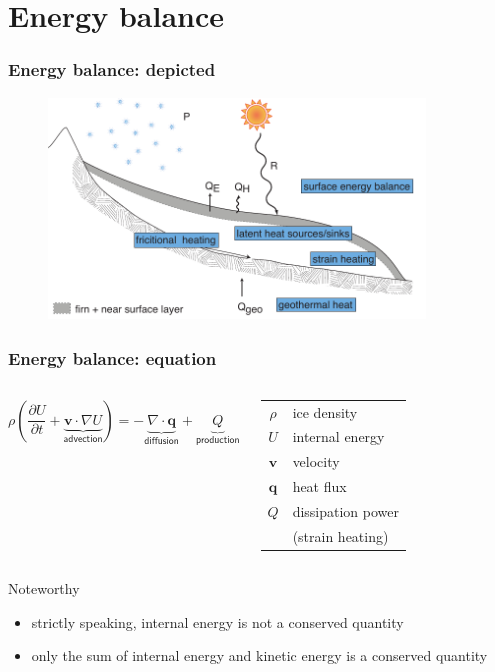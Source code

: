 \documentclass[hide notes,intlimits,unknownkeysallowed]{beamer}
\newcommand{\bq}{\mathbf{q}}
\newcommand{\bv}{\mathbf{v}}
\newcommand{\ddt}[1]{\ensuremath{\frac{\partial #1}{\partial t}}}
\newcommand{\Div}{\nabla\cdot}
\newcommand{\grad}{\nabla}
\begin{document}
\section{Energy balance}
\label{sec:energy-balance}

\begin{frame}
  \frametitle{Energy balance: depicted}
  \begin{figure}
    \includegraphics[width=10cm]{glacier_thermodynamics}
  \end{figure}
\end{frame}


\begin{frame}
  \frametitle{Energy balance: equation}
  \begin{columns}
    \column[c]{7cm}
    \begin{equation*}
      \rho \left(\ddt{U} + \underbrace{\bv \cdot \grad U}_{\textsf{advection}}\right) = - \underbrace{\Div \bq}_{\textsf{diffusion}} + \underbrace{Q}_{\textsf{production}}
    \end{equation*}
   \vspace{2em}
    \column[c]{6cm}
      \begin{tabular}{cl}
        $\rho$ \quad & ice density \\
        $U$ \quad & internal energy \\
        $\bv$ \quad & velocity \\
        $\bq$ \quad & heat flux \\
        $Q$ \quad & dissipation power \\
             & (strain heating)
      \end{tabular}
    \end{columns}
    \begin{block}{Noteworthy}
      \begin{itemize}
      \item strictly speaking, internal energy is \alert{not} a conserved quantity
      \item only the sum of \alert{internal energy} and \alert{kinetic energy} is a conserved quantity
      \end{itemize}
    \end{block}
\end{frame}
\end{document}
